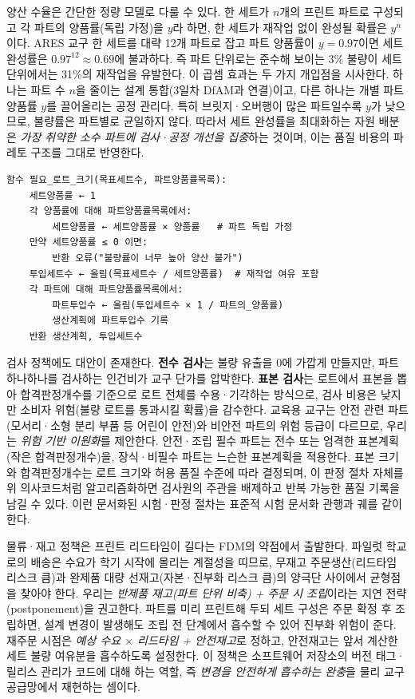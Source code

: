 양산 수율은 간단한 정량 모델로 다룰 수 있다. 한 세트가 $n$개의 프린트 파트로 구성되고 각 파트의 양품률(독립 가정)을 $y$라 하면, 한 세트가 재작업 없이 완성될 확률은 $y^{n}$이다. ARES 교구 한 세트를 대략 12개 파트로 잡고 파트 양품률이 $y=0.97$이면 세트 완성률은 $0.97^{12}\approx 0.69$에 불과하다. 즉 파트 단위로는 준수해 보이는 3\% 불량이 세트 단위에서는 31\%의 재작업을 유발한다. 이 곱셈 효과는 두 가지 개입점을 시사한다. 하나는 파트 수 $n$을 줄이는 설계 통합(3일차 DfAM과 연결)이고, 다른 하나는 개별 파트 양품률 $y$를 끌어올리는 공정 관리다. 특히 브릿지·오버행이 많은 파트일수록 $y$가 낮으므로, 불량률은 파트별로 균일하지 않다. 따라서 세트 완성률을 최대화하는 자원 배분은 \emph{가장 취약한 소수 파트에 검사·공정 개선을 집중}하는 것이며, 이는 품질 비용의 파레토 구조를 그대로 반영한다.

\begin{verbatim}
함수 필요_로트_크기(목표세트수, 파트양품률목록):
    세트양품률 ← 1
    각 양품률에 대해 파트양품률목록에서:
        세트양품률 ← 세트양품률 × 양품률   # 파트 독립 가정
    만약 세트양품률 ≤ 0 이면:
        반환 오류("불량률이 너무 높아 양산 불가")
    투입세트수 ← 올림(목표세트수 / 세트양품률)  # 재작업 여유 포함
    각 파트에 대해 파트양품률목록에서:
        파트투입수 ← 올림(투입세트수 × 1 / 파트의_양품률)
        생산계획에 파트투입수 기록
    반환 생산계획, 투입세트수
\end{verbatim}

검사 정책에도 대안이 존재한다. \textbf{전수 검사}는 불량 유출을 0에 가깝게 만들지만, 파트 하나하나를 검사하는 인건비가 교구 단가를 압박한다. \textbf{표본 검사}는 로트에서 표본을 뽑아 합격판정개수를 기준으로 로트 전체를 수용·기각하는 방식으로, 검사 비용은 낮지만 소비자 위험(불량 로트를 통과시킬 확률)을 감수한다. 교육용 교구는 안전 관련 파트(모서리·소형 분리 부품 등 어린이 안전)와 비안전 파트의 위험 등급이 다르므로, 우리는 \emph{위험 기반 이원화}를 제안한다. 안전·조립 필수 파트는 전수 또는 엄격한 표본계획(작은 합격판정개수)을, 장식·비필수 파트는 느슨한 표본계획을 적용한다. 표본 크기와 합격판정개수는 로트 크기와 허용 품질 수준에 따라 결정되며, 이 판정 절차 자체를 위 의사코드처럼 알고리즘화하면 검사원의 주관을 배제하고 반복 가능한 품질 기록을 남길 수 있다. 이런 문서화된 시험·판정 절차는 표준적 시험 문서화 관행\cite{ieee829}과 궤를 같이한다.

물류·재고 정책은 프린트 리드타임이 길다는 FDM의 약점에서 출발한다. 파일럿 학교로의 배송은 수요가 학기 시작에 몰리는 계절성을 띠므로, 무재고 주문생산(리드타임 리스크 큼)과 완제품 대량 선재고(자본·진부화 리스크 큼)의 양극단 사이에서 균형점을 찾아야 한다. 우리는 \emph{반제품 재고(파트 단위 비축) + 주문 시 조립}이라는 지연 전략(postponement)을 권고한다. 파트를 미리 프린트해 두되 세트 구성은 주문 확정 후 조립하면, 설계 변경이 발생해도 조립 전 단계에서 흡수할 수 있어 진부화 위험이 준다. 재주문 시점은 \emph{예상 수요 $\times$ 리드타임 + 안전재고}로 정하고, 안전재고는 앞서 계산한 세트 불량 여유분을 흡수하도록 설정한다. 이 정책은 소프트웨어 저장소의 버전 태그·릴리스 관리\cite{chacon2014progit}가 코드에 대해 하는 역할, 즉 \emph{변경을 안전하게 흡수하는 완충}을 물리 교구 공급망에서 재현하는 셈이다.

